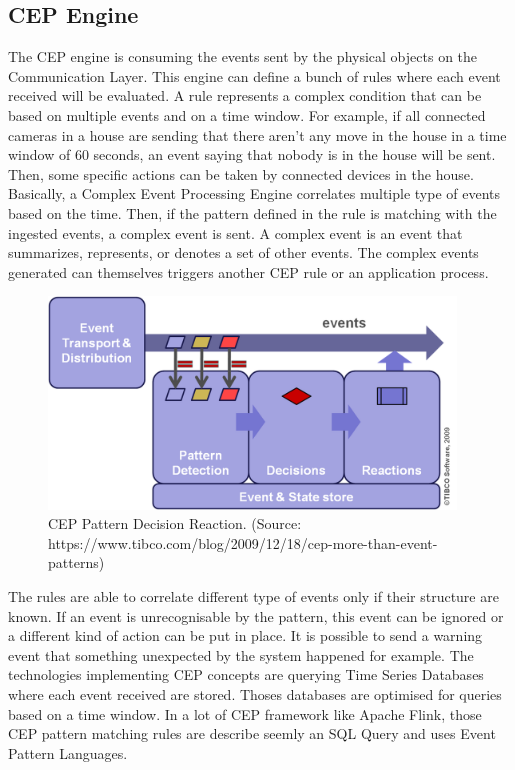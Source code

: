 \documentclass[11pt]{article}
\begin{document}
\subsection{CEP Engine} \label{cep-engine}

The CEP engine is consuming the events sent by the physical objects on the Communication Layer. This engine can define a bunch of rules where each event received will be evaluated. A rule represents a complex condition that can be based on multiple events and on a time window. For example, if all connected cameras in a house are sending that there aren't any move in the house in a time window of 60 seconds, an event saying that nobody is in the house will be sent. Then, some specific actions can be taken by connected devices in the house. Basically, a Complex Event Processing Engine correlates multiple type of events based on the time. Then, if the pattern defined in the rule is matching with the ingested events, a complex event is sent. A complex event is an event that summarizes, represents, or denotes a set of other events\cite{glossary}. The complex events generated can themselves triggers another CEP rule or an application process.
\newline
\begin{figure}[h]
	\includegraphics[width=\textwidth,height=160pt]{assets/cep-pattern-decision-reaction.png} 
	\caption[CEP Pattern Decision Reaction]{CEP Pattern Decision Reaction. (Source: https://www.tibco.com/blog/2009/12/18/cep-more-than-event-patterns)}
	\label{fig:cep-pattern-decision-reaction}
\end{figure}

The rules are able to correlate different type of events only if their structure are known. If an event is unrecognisable by the pattern, this event can be ignored or a different kind of action can be put in place. It is possible to send a warning event that something unexpected by the system happened for example. 
\newline
\newline
The technologies implementing CEP concepts are querying Time Series Databases where each event received are stored. Thoses databases are optimised for queries based on a time window. In a lot of CEP framework like Apache Flink, those CEP pattern matching rules are describe seemly an SQL Query and uses Event Pattern Languages. 
\end{document}
